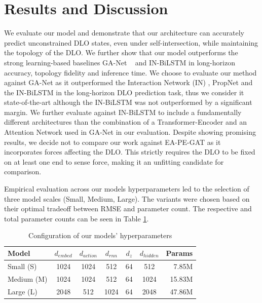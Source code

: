 \documentclass[letterpaper, 10 pt, conference]{ieeeconf}  %
\begin{document}



\section{Results and Discussion}
\label{sec:results}

We evaluate our model and demonstrate that our architecture can accurately predict unconstrained DLO states, even under self-intersection, while maintaining the topology of the DLO. We further show that our model outperforms the strong learning-based baselines GA-Net ~\cite{gu_learning_2025} and IN-BiLSTM \cite{yang_learning_2021} in long-horizon accuracy, topology fidelity and inference time. We choose to evaluate our method against GA-Net as it outperformed the Interaction Network (IN) \cite{battaglia_interaction_2016}, PropNet \cite{li_propagation_2019} and the IN-BiLSTM \cite{yang_learning_2021} in the long-horizon DLO prediction task, thus we consider it state-of-the-art although the IN-BiLSTM was not outperformed by a significant margin. We further evaluate against IN-BiLSTM to include a fundamentally different architectures than the combination of a Transformer-Encoder and an Attention Network used in GA-Net in our evaluation. Despite showing promising results, we decide not to compare our work against EA-PE-GAT \cite{yu_hybrid_2025} as it incorporates forces affecting the DLO. This strictly requires the DLO to be fixed on at least one end to sense force, making it an unfitting candidate for comparison. 

Empirical evaluation across our models hyperparameters led to the selection of three model scales (Small, Medium, Large). The variants were chosen based on their optimal tradeoff between RMSE and parameter count. The respective and total parameter counts can be seen in Table \ref{tab:model_sizes}.

\begin{table}[ht]
\vspace{-0.2cm}
\centering
\caption{Configuration of our models' hyperparameters}
\label{tab:model_sizes}
\begin{tabular}{l c c c c c r}
\toprule
\textbf{Model} & $d_{embed}$ & $d_{action}$ & $d_{rnn}$ & $d_{z}$ & $d_{hidden}$ & \textbf{Params} \\
\midrule
Small (S) & 1024 & 1024 & 512 & 64 & 512  & 7.85M  \\
Medium (M) & 1024 & 1024 & 512 & 64 & 1024  & 15.83M  \\
Large (L) & 2048 & 512 & 1024 & 64  & 2048 & 47.86M  \\
\bottomrule
\end{tabular}
\vspace{-0.5cm}
\end{table}
\end{document}

